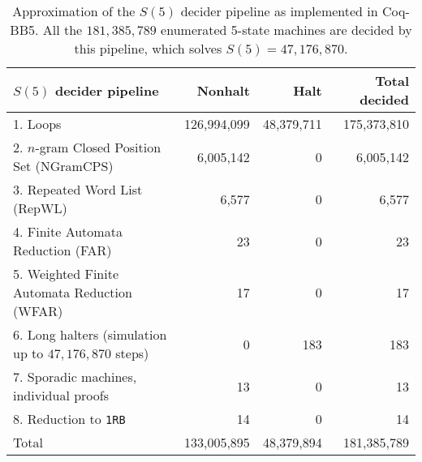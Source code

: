 \documentclass{easychair}
\newcommand{\BBtheFifth}{47{,}176{,}870}
\newcommand{\BBtheFifthTNF}{181{,}385{,}789}
\newcommand{\CoqBB}{Coq-BB5\xspace}
\theoremstyle{definition} %
\numberwithin{equation}{section}
\theoremstyle{definition} %
\begin{document}
\begin{table}[h!]
  \centering
  \begin{tabular}{|l|rrr|}
    \hline
    $S(5)$ decider pipeline                                & Nonhalt                         & Halt                           & Total decided \\
    \hline
    1. Loops                                               & 126,994,099                     & 48,379,711                     & 175,373,810   \\
    2. $n$-gram Closed Position Set (NGramCPS)             & 6,005,142                       & 0                              & 6,005,142     \\
    3. Repeated Word List (RepWL)                          & 6,577                           & 0                              & 6,577         \\
    4. Finite Automata Reduction (FAR)                     & 23                              & 0                              & 23            \\
    5. Weighted Finite Automata Reduction (WFAR)           & 17                              & 0                              & 17            \\
    6. Long halters (simulation up to $\BBtheFifth$ steps) & 0                               & 183                            & 183           \\
    7. Sporadic machines, individual proofs                & 13                              & 0                              & 13            \\
    8. Reduction to \texttt{1RB}                           & 14                              & 0                              & 14            \\ \hline
    Total                                                  & \multicolumn{1}{r}{133,005,895} & \multicolumn{1}{r}{48,379,894} & 181,385,789   \\ \hline
  \end{tabular}
  \caption{Approximation of the $S(5)$ decider pipeline as implemented in \CoqBB. All the $\BBtheFifthTNF$ enumerated 5-state machines are decided by this pipeline, which solves $S(5) = \BBtheFifth$. }\label{tab:pipelineBB5}
\end{table}






\newpage

\end{document}
